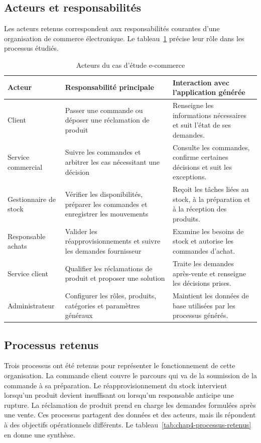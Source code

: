 \subsection{Acteurs et responsabilités}

Les acteurs retenus correspondent aux responsabilités courantes d'une
organisation de commerce électronique. Le
tableau~\ref{tab:chap4-acteurs-cas-etude} précise leur rôle dans les processus
étudiés.
\begin{table}[H]
\centering
\caption{Acteurs du cas d'étude e-commerce}
\label{tab:chap4-acteurs-cas-etude}
\begin{tabularx}{\textwidth}{p{2.8cm}p{4.2cm}X}
\toprule
\textbf{Acteur} & \textbf{Responsabilité principale} & \textbf{Interaction avec l'application générée} \\
\midrule
Client & Passer une commande ou déposer une réclamation de produit & Renseigne les informations nécessaires et suit l'état de ses demandes. \\
Service commercial & Suivre les commandes et arbitrer les cas nécessitant une décision & Consulte les commandes, confirme certaines décisions et suit les exceptions. \\
Gestionnaire de stock & Vérifier les disponibilités, préparer les commandes et enregistrer les mouvements & Reçoit les tâches liées au stock, à la préparation et à la réception des produits. \\
Responsable achats & Valider les réapprovisionnements et suivre les demandes fournisseur & Examine les besoins de stock et autorise les commandes d'achat. \\
Service client & Qualifier les réclamations de produit et proposer une solution & Traite les demandes après-vente et renseigne les décisions prises. \\
Administrateur & Configurer les rôles, produits, catégories et paramètres généraux & Maintient les données de base utilisées par les processus générés. \\
\bottomrule
\end{tabularx}
\end{table}

\subsection{Processus retenus}

Trois processus ont été retenus pour représenter le fonctionnement de cette
organisation. La commande client couvre le parcours qui va de la soumission de
la commande à sa préparation. Le réapprovisionnement du stock intervient
lorsqu'un produit devient insuffisant ou lorsqu'un responsable anticipe une
rupture. La réclamation de produit prend en charge les demandes formulées après
une vente. Ces processus partagent des données et des acteurs, mais ils répondent
à des objectifs opérationnels différents. Le
tableau~\ref{tab:chap4-processus-retenus} en donne une synthèse.

